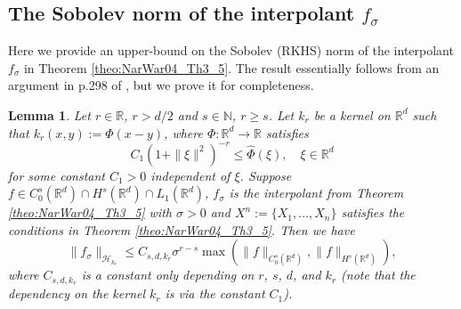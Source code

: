 \documentclass[11pt]{article}
\newtheorem{lemma}[theorem]{Lemma}
\theoremstyle{remark}
\theoremstyle{example}
\theoremstyle{remark}
\renewcommand{\H}{{\mathcal{H}}}
\newcommand{\N}{\mathbb{N}}
\newcommand{\R}{\mathbb{R}}
\begin{document}
\subsection{The Sobolev norm of the interpolant $f_\sigma$}


Here we provide an upper-bound on the Sobolev (RKHS) norm of the interpolant $f_\sigma$ in Theorem \ref{theo:NarWar04_Th3_5}.
The result essentially follows from an argument in p.298 of \cite{NarWar04}, but we prove it for completeness. 



\begin{lemma} \label{lemma:Sob_norm_interpolant_78}
Let $r\in\R$, $r > d/2$ and $s \in \N$, $r \geq s$. Let $k_r$ be a kernel on $\R^d$ such that $k_r(x,y) := \Phi(x-y)$, where $\Phi:\R^d \to \R$ satisfies 
\[
C_1 (1 + \| \xi \|^2)^{-r} \leq \hat{\Phi}(\xi), \quad \xi \in \R^d
\]
for some constant $C_1 > 0$ independent of $\xi$.
Suppose $f \in C_0^s(\R^d) \cap H^s(\R^d) \cap L_1(\R^d)$, $f_\sigma$ is the interpolant from Theorem \ref{theo:NarWar04_Th3_5} with $\sigma > 0$ and $X^n := \{X_1,\dots, X_n \}$ satisfies the conditions in Theorem \ref{theo:NarWar04_Th3_5}.
Then we have
\begin{equation}
\| f_{\sigma} \|_{ \H_{k_r} } \leq C_{s,d,k_r} \sigma^{r-s} \max \left( \| f \|_{C_0^s(\R^d)}, \| f \|_{H^s(\R^d)} \right) \label{eq:Sob_norm},
\end{equation}
where $C_{s,d,k_r}$ is a constant only depending on $r$, $s$, $d$, and $k_r$ (note that the dependency on the kernel $k_r$ is via the constant $C_1$).%
\end{lemma}
\end{document}
